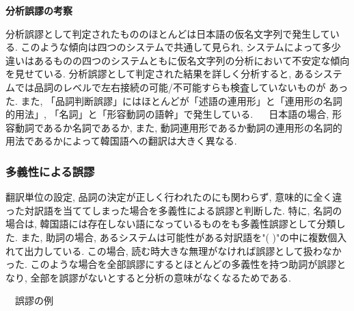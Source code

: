 \begin{flushleft}
{\bf 分析誤謬の考察}
\end{flushleft}
 
 分析誤謬として判定されたもののほとんどは日本語の仮名文字列で発生している. このような傾向は四つのシステムで共通して見られ, 
システムによって多少違いはあるものの四つのシステムともに仮名文字列の分析において不安定な傾向を見せている. 
分析誤謬として判定された結果を詳しく分析すると, あるシステムでは品詞のレベルで左右接続の可能/不可能すらも検査していないものが
あった. また, 「品詞判断誤謬」にはほとんどが「述語の連用形」と「連用形の名詞的用法」, 「名詞」と「形容動詞の語幹」で発生している. 　
日本語の場合, 形容動詞であるか名詞であるか, また, 動詞連用形であるか動詞の連用形の名詞的用法であるかによって韓国語への翻訳は大きく異なる. 

\subsubsection{多義性による誤謬}
翻訳単位の設定, 品詞の決定が正しく行われたのにも関わらず, 意味的に全く違った対訳語を当ててしまった場合を多義性による誤謬と判断した. 特に, 名詞の場合は, 韓国語には存在しない語になっているものをも多義性誤謬として分類した.  また, 助詞の場合, あるシステムは可能性がある対訳語を"( )"の中に複数個入れて出力している. この場合, 読む時大きな無理がなければ誤謬として扱わなかった. このような場合を全部誤謬にするとほとんどの多義性を持つ助詞が誤謬となり, 全部を誤謬がないとすると分析の意味がなくなるためである. 

\begin{flushleft}
　誤謬の例
\end{flushleft}

